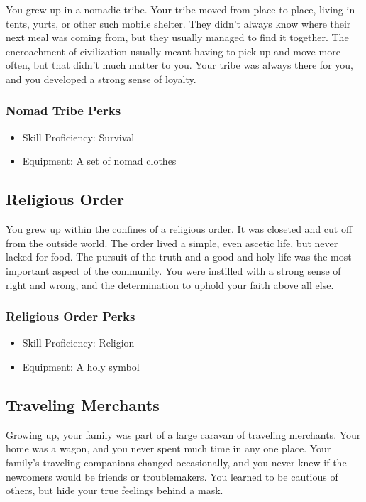 \begin{multicols}{2}
You grew up in a nomadic tribe. Your tribe moved from place to place,
living in tents, yurts, or other such mobile shelter. They didn't
always know where their next meal was coming from, but they usually
managed to find it together. The encroachment of civilization usually
meant having to pick up and move more often, but that didn't much
matter to you. Your tribe was always there for you, and you developed
a strong sense of loyalty.

\subsubsection{Nomad Tribe Perks}

\begin{itemize}
  \item Skill Proficiency: Survival
  \item Equipment: A set of nomad clothes
\end{itemize}

\subsection{Religious Order}

You grew up within the confines of a religious order. It was closeted
and cut off from the outside world. The order lived a simple, even
ascetic life, but never lacked for food. The pursuit of the truth and
a good and holy life was the most important aspect of the community.
You were instilled with a strong sense of right and wrong, and the
determination to uphold your faith above all else.

\subsubsection{Religious Order Perks}

\begin{itemize}
  \item Skill Proficiency: Religion
  \item Equipment: A holy symbol
\end{itemize}

\subsection{Traveling Merchants}

Growing up, your family was part of a large caravan of traveling merchants.
Your home was a wagon, and you never spent much time in any one place.
Your family's traveling companions changed occasionally, and you never
knew if the newcomers would be friends or troublemakers. You learned to
be cautious of others, but hide your true feelings behind a mask.


\end{multicols}
